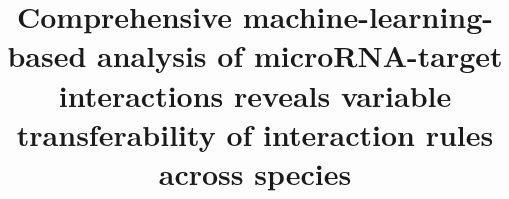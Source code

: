 \documentclass{bmcart}
\begin{document}
\begin{frontmatter}

\begin{fmbox}



\title{Comprehensive machine-learning-based analysis of microRNA-target interactions reveals variable transferability of interaction rules across species}



\author[
   addressref={aff1},                   %
   email={benorgi@post.bgu.ac.il}       %
]{ }
   
\author[
  addressref={aff1},                   %
  corref={aff1},                       %
  email={vaksler@post.bgu.ac.il}
]{ }



\address[id=aff1]{%
  , 
  ,                              %
}



\end{fmbox}
\end{frontmatter}
\end{document}
